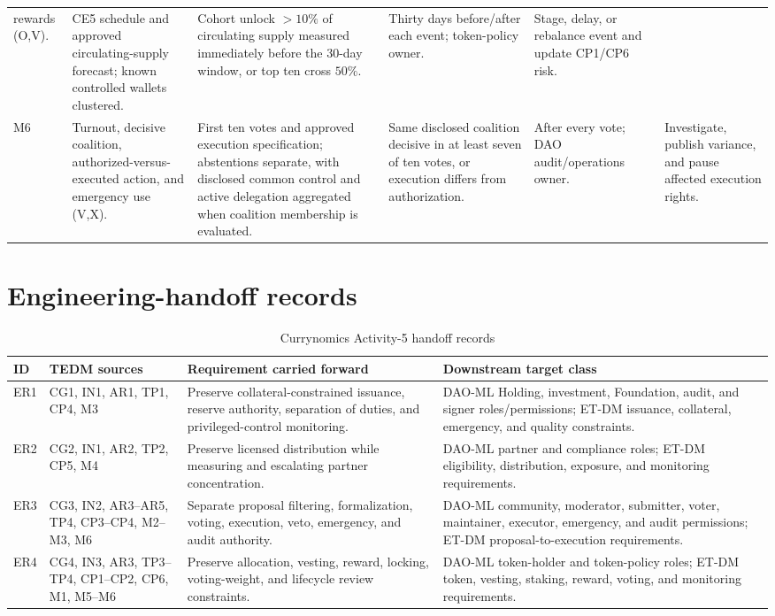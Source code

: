 \documentclass[10pt]{article}
\begin{document}
\begin{landscape}
\begin{table}[h]
\begin{tabularx}{\linewidth}{@{}p{.05\linewidth}p{.16\linewidth}YYYY@{}}
rewards (O,V). & CE5 schedule and approved circulating-supply forecast; known
controlled wallets clustered. & Cohort unlock $>10\%$ of circulating supply
measured immediately before the 30-day window, or top ten cross $50\%$. & Thirty days before/after each event;
token-policy owner. & Stage, delay, or rebalance event and update CP1/CP6 risk. \\
M6 & Turnout, decisive coalition, authorized-versus-executed action, and
emergency use (V,X). & First ten votes and approved execution specification;
abstentions separate, with disclosed common control and active delegation
aggregated when coalition membership is evaluated. & Same disclosed coalition
decisive in at least seven of ten votes, or execution differs from
authorization. & After every
vote; DAO audit/operations owner. & Investigate, publish variance, and pause
affected execution rights. \\
\bottomrule
\end{tabularx}
\end{table}
\end{landscape}

\section*{Engineering-handoff records}
\begin{table}[h]
\caption{Currynomics Activity-5 handoff records}
\centering
\small
\begin{tabularx}{\linewidth}{@{}p{.07\linewidth}p{.18\linewidth}YY@{}}
\toprule
ID & TEDM sources & Requirement carried forward & Downstream target class \\
\midrule
ER1 & CG1, IN1, AR1, TP1, CP4, M3 & Preserve collateral-constrained issuance, reserve
authority, separation of duties, and privileged-control monitoring. & DAO-ML
Holding, investment, Foundation, audit, and signer roles/permissions; ET-DM
issuance, collateral, emergency, and quality constraints. \\
ER2 & CG2, IN1, AR2, TP2, CP5, M4 & Preserve licensed distribution while measuring and
escalating partner concentration. & DAO-ML partner and compliance roles; ET-DM
eligibility, distribution, exposure, and monitoring requirements. \\
ER3 & CG3, IN2, AR3--AR5, TP4, CP3--CP4, M2--M3, M6 & Separate proposal filtering,
formalization, voting, execution, veto, emergency, and audit authority. &
DAO-ML community, moderator, submitter, voter, maintainer, executor, emergency,
and audit permissions; ET-DM proposal-to-execution requirements. \\
ER4 & CG4, IN3, AR3, TP3--TP4, CP1--CP2, CP6, M1, M5--M6 & Preserve allocation, vesting,
reward, locking, voting-weight, and lifecycle review constraints. & DAO-ML
token-holder and token-policy roles; ET-DM token, vesting, staking, reward,
voting, and monitoring requirements. \\
\bottomrule
\end{tabularx}
\end{table}
\end{document}
